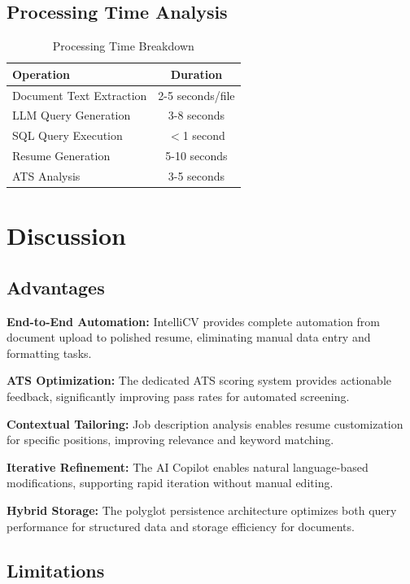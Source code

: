 \documentclass[conference]{IEEEtran}
\begin{document}
\subsection{Processing Time Analysis}

\begin{table}[h]
\centering
\caption{Processing Time Breakdown}
\label{tab:timing}
\begin{tabular}{@{}lc@{}}
\toprule
\textbf{Operation} & \textbf{Duration} \\
\midrule
Document Text Extraction & 2-5 seconds/file \\
LLM Query Generation & 3-8 seconds \\
SQL Query Execution & $<$1 second \\
Resume Generation & 5-10 seconds \\
ATS Analysis & 3-5 seconds \\
\bottomrule
\end{tabular}
\end{table}

\section{Discussion}

\subsection{Advantages}

\textbf{End-to-End Automation:} IntelliCV provides complete automation from document upload to polished resume, eliminating manual data entry and formatting tasks.

\textbf{ATS Optimization:} The dedicated ATS scoring system provides actionable feedback, significantly improving pass rates for automated screening.

\textbf{Contextual Tailoring:} Job description analysis enables resume customization for specific positions, improving relevance and keyword matching.

\textbf{Iterative Refinement:} The AI Copilot enables natural language-based modifications, supporting rapid iteration without manual editing.

\textbf{Hybrid Storage:} The polyglot persistence architecture optimizes both query performance for structured data and storage efficiency for documents.

\subsection{Limitations}
\end{document}
